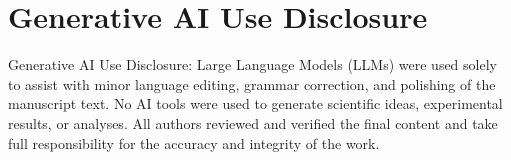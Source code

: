 \documentclass{Interspeech}
\begin{document}

\section{Generative AI Use Disclosure}
Generative AI Use Disclosure: Large Language Models (LLMs) were used solely to assist with minor language editing, grammar correction, and polishing of the manuscript text. No AI tools were used to generate scientific ideas, experimental results, or analyses. All authors reviewed and verified the final content and take full responsibility for the accuracy and integrity of the work.



\end{document}
